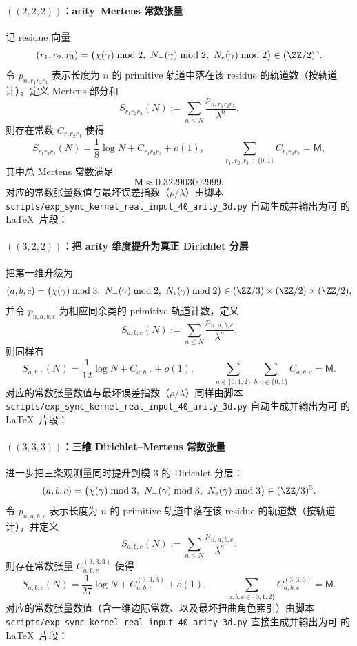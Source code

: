 \paragraph{\texorpdfstring{$((2,2,2))$}{(2,2,2)}：arity--Mertens 常数张量}
记 residue 向量
$$
(r_1,r_2,r_3)=\bigl(\chi(\gamma)\bmod 2,\ N_-(\gamma)\bmod 2,\ N_e(\gamma)\bmod 2\bigr)\in(\ZZ/2)^3.
$$
令 $p_{n,r_1r_2r_3}$ 表示长度为 $n$ 的 primitive 轨道中落在该 residue 的轨道数（按轨道计）。定义 Mertens 部分和
$$
S_{r_1r_2r_3}(N):=\sum_{n\le N}\frac{p_{n,r_1r_2r_3}}{\lambda^n}.
$$
则存在常数 $C_{r_1r_2r_3}$ 使得
$$
S_{r_1r_2r_3}(N)=\frac{1}{8}\log N + C_{r_1r_2r_3}+o(1),
\qquad
\sum_{r_1,r_2,r_3\in\{0,1\}}C_{r_1r_2r_3}=\mathsf{M},
$$
其中总 Mertens 常数满足
$$
\mathsf{M}\approx 0.322903002999.
$$
对应的常数张量数值与最坏误差指数（$\rho/\lambda$）由脚本
\texttt{scripts/exp\_sync\_kernel\_real\_input\_40\_arity\_3d.py}
自动生成并输出为可 \verb|| 的 \LaTeX\ 片段：


\paragraph{\texorpdfstring{$((3,2,2))$}{(3,2,2)}：把 arity 维度提升为真正 Dirichlet 分层}
把第一维升级为
$$
(a,b,c)=\bigl(\chi(\gamma)\bmod 3,\ N_-(\gamma)\bmod 2,\ N_e(\gamma)\bmod 2\bigr)\in(\ZZ/3)\times(\ZZ/2)\times(\ZZ/2),
$$
并令 $p_{n,a,b,c}$ 为相应同余类的 primitive 轨道计数，定义
$$
S_{a,b,c}(N):=\sum_{n\le N}\frac{p_{n,a,b,c}}{\lambda^n}.
$$
则同样有
$$
S_{a,b,c}(N)=\frac{1}{12}\log N + C_{a,b,c}+o(1),
\qquad
\sum_{a\in\{0,1,2\}}\sum_{b,c\in\{0,1\}}C_{a,b,c}=\mathsf{M}.
$$
对应的常数张量数值与最坏误差指数（$\rho/\lambda$）同样由脚本
\texttt{scripts/exp\_sync\_kernel\_real\_input\_40\_arity\_3d.py}
自动生成并输出为可 \verb|| 的 \LaTeX\ 片段：


\paragraph{\texorpdfstring{$((3,3,3))$}{(3,3,3)}：三维 Dirichlet--Mertens 常数张量}
进一步把三条观测量同时提升到模 $3$ 的 Dirichlet 分层：
$$
(a,b,c)=\bigl(\chi(\gamma)\bmod 3,\ N_-(\gamma)\bmod 3,\ N_e(\gamma)\bmod 3\bigr)\in(\ZZ/3)^3.
$$
令 $p_{n,a,b,c}$ 表示长度为 $n$ 的 primitive 轨道中落在该 residue 的轨道数（按轨道计），并定义
$$
S_{a,b,c}(N):=\sum_{n\le N}\frac{p_{n,a,b,c}}{\lambda^n}.
$$
则存在常数张量 $C^{(3,3,3)}_{a,b,c}$ 使得
$$
S_{a,b,c}(N)=\frac{1}{27}\log N + C^{(3,3,3)}_{a,b,c}+o(1),
\qquad
\sum_{a,b,c\in\{0,1,2\}} C^{(3,3,3)}_{a,b,c}=\mathsf{M}.
$$
对应的常数张量数值（含一维边际常数、以及最坏扭曲角色索引）由脚本
\texttt{scripts/exp\_sync\_kernel\_real\_input\_40\_arity\_3d.py}
直接生成并输出为可 \verb|| 的 \LaTeX\ 片段：


